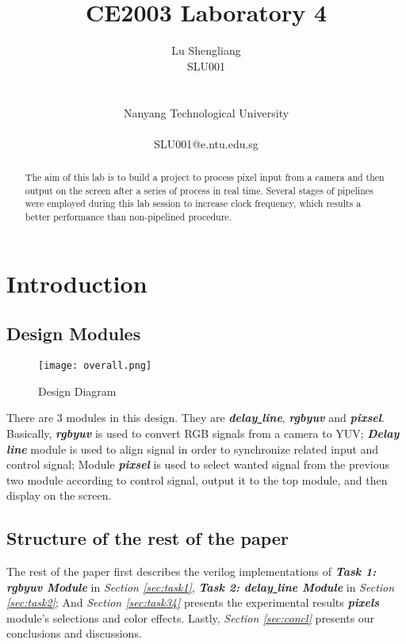 \documentclass[12pt,fleqn]{article}
\title{CE2003 Laboratory 4}
\author{
  Lu Shengliang \\
  SLU001\\
  \Organization{} \\
  \vspace*{-10mm} \\
  Nanyang Technological University \\
  \vspace*{-10mm} \\
  SLU001@e.ntu.edu.sg
}
\begin{document}
\maketitle

\begin{abstract}
The aim of this lab is to build a project to process pixel input from a camera and then output on the screen after a series of process in real time. Several stages of pipelines were employed during this lab session to increase clock frequency, which results a better performance than non-pipelined procedure.
\end{abstract}



\section{Introduction}
\label{sec:intro}

\subsection{Design Modules}
\begin{figure}[H]
\centering
\texttt{[image: overall.png]}
\caption{Design Diagram}
\label{fig:overall}
\end{figure}
There are 3 modules in this design. They are \textbf{\emph{delay\underline{ }line}}, \textbf{\emph{rgbyuv}} and \textbf{\emph{pixsel}}. Basically, \textbf{\emph{rgbyuv}} is used to convert RGB signals from a camera to YUV; \textbf{\emph{Delay\underline{ }line}} module is used to align signal in order to synchronize related input and control signal; Module \textbf{\emph{pixsel}} is used to select wanted signal from the previous two module according to control signal, output it to the top module, and then display on the screen.

\subsection{Structure of the rest of the paper}
The rest of the paper first describes the verilog implementations of \textbf{\emph{Task 1: rgbyuv Module}} in \emph{Section \ref{sec:task1}}, \textbf{\emph{Task 2: delay\underline{ }line Module}} in \emph{Section \ref{sec:task2}}; And \emph{Section \ref{sec:task34}} presents the experimental results \textbf{\emph{pixels}} module's selections and color effects. Lastly, \emph{Section \ref{sec:concl}} presents our conclusions and discussions.
\end{document}
